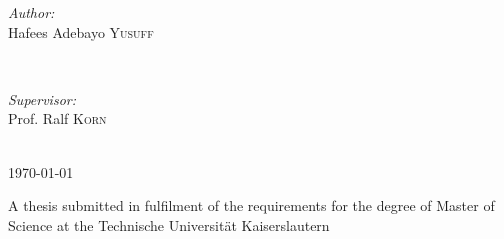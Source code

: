 \begin{titlepage}
\begin{minipage}{0.4\textwidth}
\begin{flushleft} \large
\emph{Author:}\\
Hafees Adebayo \textsc{Yusuff} %
\end{flushleft}
\end{minipage}
~
\begin{minipage}{0.4\textwidth}
\begin{flushleft} \large
\emph{Supervisor:} \\
Prof. Ralf \textsc{Korn} %
\end{flushleft}
\end{minipage}\\[4cm]




{\large \today}\\[3cm] %
\vspace{2.5cm}


A thesis submitted in fulfilment of the requirements for the degree of
Master of Science at the Technische Universität Kaiserslautern




\vfill %
\end{titlepage}



